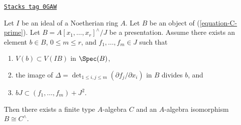 \begin{lemma}
\label{restricted-lemma-approximate-presentation-rig-smooth}
\href{https://stacks.math.columbia.edu/tag/0GAW}{\texttt{Stacks tag 0GAW}}

Let $I$ be an ideal of a Noetherian ring $A$. Let $B$ be an object
of (\ref{equation-C-prime}). Let $B = A[x_1, \ldots, x_r]^\wedge/J$
be a presentation. Assume there exists an element
$b \in B$, $0 \leq m \leq r$, and $f_1, \ldots, f_m \in J$
such that
\begin{enumerate}
\item $V(b) \subset V(IB)$ in $\Spec(B)$,
\item the image of
$\Delta = \det_{1 \leq i, j \leq m}(\partial f_j/\partial x_i)$
in $B$ divides $b$, and
\item $b J \subset (f_1, \ldots, f_m) + J^2$.
\end{enumerate}
Then there exists a finite type $A$-algebra $C$ and an $A$-algebra
isomorphism $B \cong C^\wedge$.
\end{lemma}

